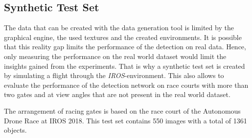 \subsection{Synthetic Test Set}

The data that can be created with the data generation tool is limited by the graphical engine, the used textures and the created environments. It is possible that this reality gap limits the performance of the detection on real data. Hence, only measuring the performance on the real world dataset would limit the insights gained from the experiments. That is why a synthetic test set is created by simulating a flight through the \textit{IROS}-environment. This also allows to evaluate the performance of the detection network on race courts with more than two gates and at view angles that are not present in the real world dataset.  

The arrangement of racing gates is based on the race court of the Autonomous Drone Race at \ac{IROS} 2018. This test set contains 550 images with a total of 1361 objects.



